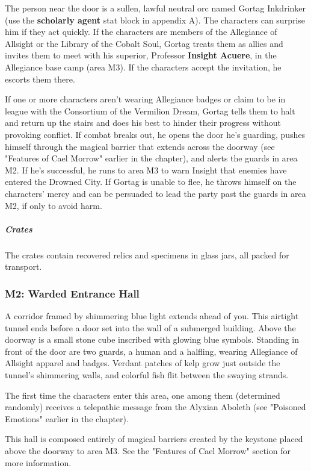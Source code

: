 \documentclass[10pt,a4paper,twoside,fancy,bg=print,twocolumn,openany,nodeprecatedcode]{dndbook}
\begin{document}
The person near the door is a sullen, lawful neutral orc named Gortag Inkdrinker (use the \textbf{scholarly agent} stat block in appendix A). The characters can surprise him if they act quickly. If the characters are members of the Allegiance of Allsight or the Library of the Cobalt Soul, Gortag treats them as allies and invites them to meet with his superior, Professor \textbf{Insight Acuere}, in the Allegiance base camp (area M3). If the characters accept the invitation, he escorts them there.

If one or more characters aren't wearing Allegiance badges or claim to be in league with the Consortium of the Vermilion Dream, Gortag tells them to halt and return up the stairs and does his best to hinder their progress without provoking conflict. If combat breaks out, he opens the door he's guarding, pushes himself through the magical barrier that extends across the doorway (see "Features of Cael Morrow" earlier in the chapter), and alerts the guards in area M2. If he's successful, he runs to area M3 to warn Insight that enemies have entered the Drowned City. If Gortag is unable to flee, he throws himself on the characters' mercy and can be persuaded to lead the party past the guards in area M2, if only to avoid harm.

\subparagraph{Crates}
The crates contain recovered relics and specimens in glass jars, all packed for transport.

\subsubsection{M2: Warded Entrance Hall}
\begin{DndReadAloud}{}
A corridor framed by shimmering blue light extends ahead of you. This airtight tunnel ends before a door set into the wall of a submerged building. Above the doorway is a small stone cube inscribed with glowing blue symbols. Standing in front of the door are two guards, a human and a halfling, wearing Allegiance of Allsight apparel and badges. Verdant patches of kelp grow just outside the tunnel's shimmering walls, and colorful fish flit between the swaying strands.

\end{DndReadAloud}

The first time the characters enter this area, one among them (determined randomly) receives a telepathic message from the Alyxian Aboleth (see "Poisoned Emotions" earlier in the chapter).

This hall is composed entirely of magical barriers created by the keystone placed above the doorway to area M3. See the "Features of Cael Morrow" section for more information.
\end{document}
